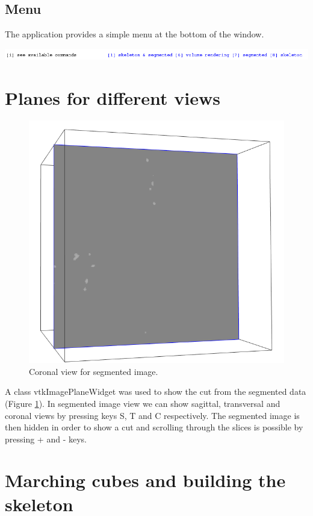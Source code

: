 \subsection{Menu}
The application provides a simple menu at the bottom of the window.

\includegraphics[scale=0.4]{fig/menu}

\section{Planes for different views}

\begin{figure}
	\centering
	\includegraphics[scale=0.5]{fig/image-plane}
	\caption{Coronal view for segmented image.}
	\label{fig:image-plane}
\end{figure}

A class vtkImagePlaneWidget was used to show the cut from the segmented data (Figure \ref{fig:image-plane}). In segmented image view we can show sagittal, transversal and coronal views by pressing keys S, T and C respectively. The segmented image is then hidden in order to show a cut and scrolling through the slices is possible by pressing + and - keys.

\section{Marching cubes and building the skeleton}


